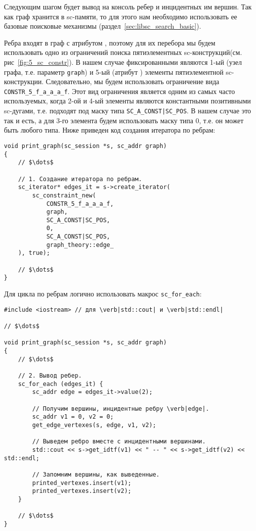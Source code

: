 Следующим шагом будет вывод на консоль ребер и инцидентных им
вершин. Так как граф хранится в sc-памяти, то для этого нам необходимо
использовать ее базовые поисковые механизмы
(раздел~\ref{sec:libsc_search_basic}).

Ребра входят в граф с атрибутом , поэтому для их
перебора мы будем использовать одно из ограничений поиска
пятиэлементных sc-конструкций(см. рис~\ref{fig:5_sc_constr}). В нашем
случае фиксированными являются 1-ый (узел графа, т.е. параметр
\lstinline|graph|) и 5-ый (атрибут ) элементы
пятиэлементной sc-конструкции. Следовательно, мы будем использовать
ограничение вида \lstinline|CONSTR_5_f_a_a_a_f|. Этот вид ограничения
является одним из самых часто используемых, когда 2-ой и 4-ый элементы
являются константными позитивными sc-дугами, т.е. подходят под маску
типа \lstinline+SC_A_CONST|SC_POS+. В нашем случае это так и есть, а
для 3-го элемента будем использовать маску типа 0, т.е. он может быть
любого типа. Ниже приведен код создания итератора по ребрам:

\begin{lstlisting}[texcl]
void print_graph(sc_session *s, sc_addr graph)
{
    // $\dots$

    // 1. Создание итератора по ребрам.
    sc_iterator* edges_it = s->create_iterator(
        sc_constraint_new(
            CONSTR_5_f_a_a_a_f,
            graph,
            SC_A_CONST|SC_POS,
            0,
            SC_A_CONST|SC_POS,
            graph_theory::edge_
    ), true);

    // $\dots$
}
\end{lstlisting}

Для цикла по ребрам логично использовать макрос
\lstinline|sc_for_each|:

\begin{lstlisting}[texcl]
#include <iostream> // для \verb|std::cout| и \verb|std::endl|

// $\dots$

void print_graph(sc_session *s, sc_addr graph)
{
    // $\dots$

    // 2. Вывод ребер.
    sc_for_each (edges_it) {
        sc_addr edge = edges_it->value(2);

        // Получим вершины, инцидентные ребру \verb|edge|.
        sc_addr v1 = 0, v2 = 0;
        get_edge_vertexes(s, edge, v1, v2);

        // Выведем ребро вместе с инцидентными вершинами.
        std::cout << s->get_idtf(v1) << " -- " << s->get_idtf(v2) << std::endl;

        // Запомним вершины, как выведенные.
        printed_vertexes.insert(v1);
        printed_vertexes.insert(v2);
    }

    // $\dots$
}
\end{lstlisting}

